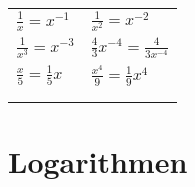 \documentclass{report}
\begin{document}
\begin{tabularx}{1\textwidth} { 
    >{\centering\arraybackslash}X 
    >{\centering\arraybackslash}X  }
    \begin{math}
        \frac{1}{x} = x^{-1}
    \end{math}
    &
    \begin{math}
        \frac{1}{x^2} = x^{-2}
    \end{math}
    \\ [7pt]
    \begin{math}
        \frac{1}{x^3} = x^{-3}
    \end{math}
    &
    \begin{math}
        \frac{4}{3}x^{-4} = \frac{4}{3x^{-4}}
    \end{math}
    \\ [7pt]
    \begin{math}
        \frac{x}{5} = \frac{1}{5}x
    \end{math}
    &
    \begin{math}
        \frac{x^4}{9} = \frac{1}{9}x^4
    \end{math}
    \\ [7pt]
    \begin{math}
        {}
    \end{math}
    &
    \begin{math}
        {}
    \end{math}
    \\ [7pt]
    \begin{math}
        {}
    \end{math}
    &
    \begin{math}
        {}
    \end{math}
    \\ [7pt]
\end{tabularx}


\section{Logarithmen}
\end{document}
